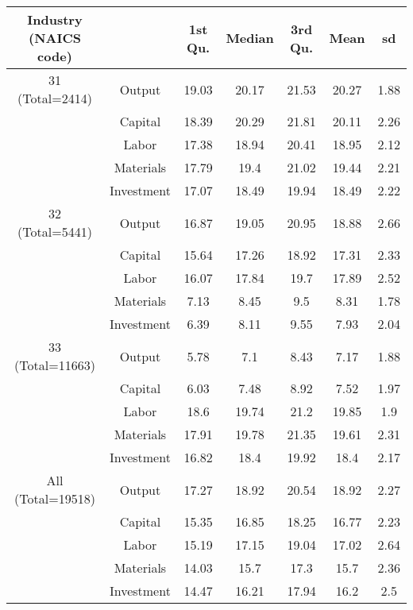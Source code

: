 \begin{table}[H]
\centering
\begin{tabular}{ccccccc}
  \hline\hline Industry (NAICS code) &   & 1st Qu. & Median & 3rd Qu. & Mean & sd \\ 
  \hline
31 (Total=2414) & Output & 19.03 & 20.17 & 21.53 & 20.27 & 1.88 \\ 
   & Capital & 18.39 & 20.29 & 21.81 & 20.11 & 2.26 \\ 
   & Labor & 17.38 & 18.94 & 20.41 & 18.95 & 2.12 \\ 
   & Materials & 17.79 & 19.4 & 21.02 & 19.44 & 2.21 \\ 
   & Investment & 17.07 & 18.49 & 19.94 & 18.49 & 2.22 \\ 
  32 (Total=5441) & Output & 16.87 & 19.05 & 20.95 & 18.88 & 2.66 \\ 
   & Capital & 15.64 & 17.26 & 18.92 & 17.31 & 2.33 \\ 
   & Labor & 16.07 & 17.84 & 19.7 & 17.89 & 2.52 \\ 
   & Materials & 7.13 & 8.45 & 9.5 & 8.31 & 1.78 \\ 
   & Investment & 6.39 & 8.11 & 9.55 & 7.93 & 2.04 \\ 
  33 (Total=11663) & Output & 5.78 & 7.1 & 8.43 & 7.17 & 1.88 \\ 
   & Capital & 6.03 & 7.48 & 8.92 & 7.52 & 1.97 \\ 
   & Labor & 18.6 & 19.74 & 21.2 & 19.85 & 1.9 \\ 
   & Materials & 17.91 & 19.78 & 21.35 & 19.61 & 2.31 \\ 
   & Investment & 16.82 & 18.4 & 19.92 & 18.4 & 2.17 \\ 
  All (Total=19518) & Output & 17.27 & 18.92 & 20.54 & 18.92 & 2.27 \\ 
   & Capital & 15.35 & 16.85 & 18.25 & 16.77 & 2.23 \\ 
   & Labor & 15.19 & 17.15 & 19.04 & 17.02 & 2.64 \\ 
   & Materials & 14.03 & 15.7 & 17.3 & 15.7 & 2.36 \\ 
   & Investment & 14.47 & 16.21 & 17.94 & 16.2 & 2.5 \\ 
   \hline
\end{tabular}
\end{table}
